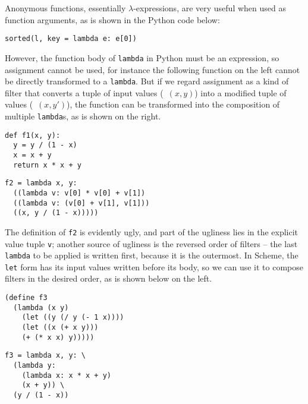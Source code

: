 Anonymous functions, essentially $\lambda$-expressions, are very useful
when used as function arguments, as is shown in the Python code below:
\begin{quoting}
\begin{Verbatim}
sorted(l, key = lambda e: e[0])
\end{Verbatim}
\end{quoting}
However, the function body of \verb|lambda| in Python must be an expression,
so assignment cannot be used, for instance the following function on the left
cannot be directly transformed to a \verb|lambda|.  But if we regard assignment
as a kind of filter that converts a tuple of input values (\eg~$(x, y)$) into
a modified tuple of values (\eg~$(x, y')$), the function can be transformed
into the composition of multiple \verb|lambda|s, as is shown on the right.
\colskipa\begin{multicols}{2}
\begin{quoting}
\begin{Verbatim}
def f1(x, y):
  y = y / (1 - x)
  x = x + y
  return x * x + y
\end{Verbatim}
\end{quoting}
\begin{quoting}
\begin{Verbatim}
f2 = lambda x, y:
  ((lambda v: v[0] * v[0] + v[1])
  ((lambda v: (v[0] + v[1], v[1]))
  ((x, y / (1 - x)))))
\end{Verbatim}
\end{quoting}
\end{multicols}\colskipb\noindent%
The definition of \verb|f2| is evidently ugly, and part of the ugliness
lies in the explicit value tuple \verb|v|; another source of ugliness is the
reversed order of filters -- the last \verb|lambda| to be applied is written
first, because it is the outermost.  In Scheme, the \verb|let| form has
its input values written before its body, so we can use it to compose
filters in the desired order, as is shown below on the left.
\colskipa\begin{multicols}{2}
\begin{quoting}
\begin{Verbatim}
(define f3
  (lambda (x y)
    (let ((y (/ y (- 1 x))))
    (let ((x (+ x y)))
    (+ (* x x) y)))))
\end{Verbatim}
\end{quoting}
\begin{quoting}
\begin{Verbatim}
f3 = lambda x, y: \
  (lambda y:
    (lambda x: x * x + y)
    (x + y)) \
  (y / (1 - x))
\end{Verbatim}
\end{quoting}
\end{multicols}\colskipb\noindent%
